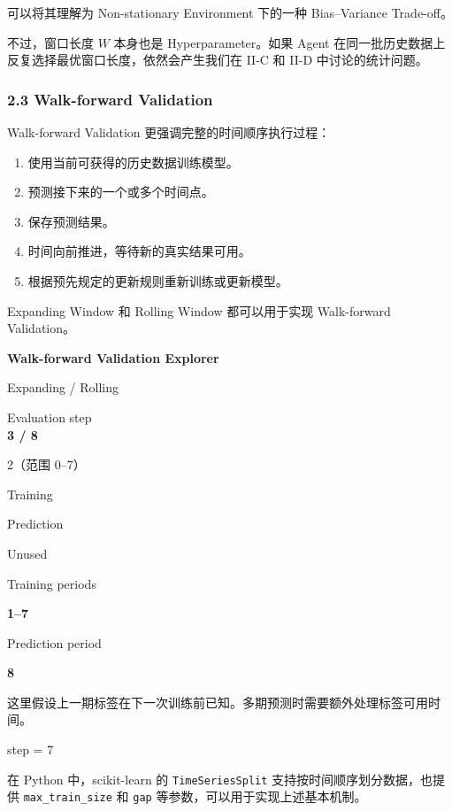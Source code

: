 可以将其理解为 Non-stationary Environment 下的一种 Bias--Variance Trade-off。

不过，窗口长度 \(W\) 本身也是 Hyperparameter。如果 Agent 在同一批历史数据上反复选择最优窗口长度，依然会产生我们在 II-C 和 II-D 中讨论的统计问题。

\hypertarget{part-2-27-0001-walk-forward-validation}{%
\subsubsection{2.3 Walk-forward Validation}\label{part-2-27-0001-walk-forward-validation}}

Walk-forward Validation 更强调完整的时间顺序执行过程：

\begin{enumerate}
\def\labelenumi{\arabic{enumi}.}
\tightlist
\item
  使用当前可获得的历史数据训练模型。
\item
  预测接下来的一个或多个时间点。
\item
  保存预测结果。
\item
  时间向前推进，等待新的真实结果可用。
\item
  根据预先规定的更新规则重新训练或更新模型。
\end{enumerate}

Expanding Window 和 Rolling Window 都可以用于实现 Walk-forward Validation。

\textbf{Walk-forward Validation Explorer}

Expanding / Rolling

Evaluation step\\
\textbf{3 / 8}

2（范围 0--7）


Training

Prediction

Unused

Training periods

\textbf{1--7}

Prediction period

\textbf{8}

这里假设上一期标签在下一次训练前已知。多期预测时需要额外处理标签可用时间。

step = 7


在 Python 中，scikit-learn 的 \texttt{TimeSeriesSplit} 支持按时间顺序划分数据，也提供 \texttt{max\_train\_size} 和 \texttt{gap} 等参数，可以用于实现上述基本机制。

